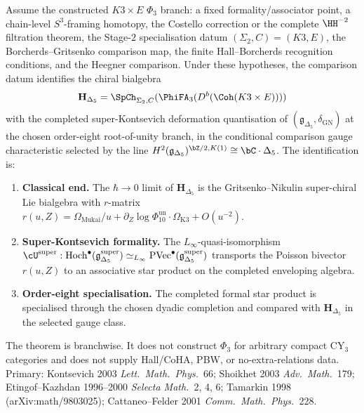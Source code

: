 \begin{theorem}
\label{thm:phiutp-phi3-as-super-kontsevich}
Assume the constructed \(K3\times E\) $\Phi_3$ branch: a fixed
formality/associator point, a chain-level \(S^3\)-framing homotopy, the
Costello correction or the complete \(\HH^{-2}\) filtration theorem, the
Stage-$2$ specialisation datum \((\Sigma_2,C)=(K3,E)\), the
Borcherds--Gritsenko comparison map, the finite Hall--Borcherds
recognition conditions, and the Heegner comparison. Under these hypotheses, the
comparison datum identifies the chiral bialgebra
\[
 \mathbf{H}_{\Delta_5}
 =
 \SpCh_{\Sigma_2,C}(\PhiFA_3(D^b(\Coh(K3\times E))))
\]
with the completed super-Kontsevich deformation quantisation of
$(\mathfrak{g}_{\Delta_5}, \delta_{\mathrm{GN}})$ at the chosen
order-eight root-of-unity branch, in the conditional comparison gauge characteristic
selected by the line
$H^2(\mathfrak{g}_{\Delta_5})^{\bZ/2, K(1)} \cong
\bC\cdot\Delta_5$. The identification is:
\begin{enumerate}[label=\textup{(\roman*)}]
 \item \textbf{Classical end.} The $\hbar \to 0$ limit of
 $\mathbf{H}_{\Delta_5}$ is the Gritsenko--Nikulin super-chiral
 Lie bialgebra with $r$-matrix
 $r(u, Z) = \Omega_{\mathrm{Mukai}}/u +
 \partial_Z\log\Phi_{10}^{\mathrm{un}}\cdot\Omega_{\mathrm{K3}} + O(u^{-2})$.
 \item \textbf{Super-Kontsevich formality.} The $L_\infty$-quasi-isomorphism
 $\cU^{\mathrm{super}}: \mathrm{Hoch}^\bullet
 (\mathfrak{g}_{\Delta_5}^{\mathrm{super}}) \simeq_{L_\infty}
 \mathrm{PVec}^\bullet(\mathfrak{g}_{\Delta_5}^{\mathrm{super}})$
 transports the Poisson bivector $r(u, Z)$ to an associative
 star product on the completed enveloping algebra.
 \item \textbf{Order-eight specialisation.} The completed formal
 star product is specialised through the chosen dyadic completion and
 compared with $\mathbf{H}_{\Delta_5}$ in the selected gauge class.
\end{enumerate}
The theorem is branchwise. It does not construct $\Phi_3$ for arbitrary
compact CY$_3$ categories and does not supply Hall/CoHA, PBW, or
no-extra-relations data.
Primary: Kontsevich 2003 \emph{Lett.\ Math.\ Phys.}~66; Shoikhet 2003
\emph{Adv.\ Math.}~179; Etingof--Kazhdan 1996--2000 \emph{Selecta
Math.}~2, 4, 6; Tamarkin 1998 (arXiv:math/9803025); Cattaneo--Felder
2001 \emph{Comm.\ Math.\ Phys.}~228.
\end{theorem}

